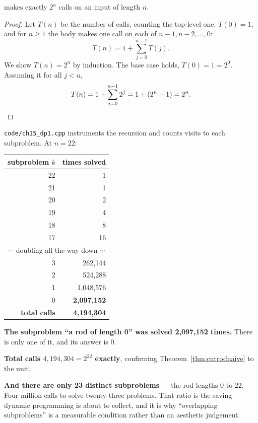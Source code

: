 \begin{theorem}\label{thm:cutrodnaive}
 makes exactly $2^{n}$ calls on an input of length $n$.
\end{theorem}

\begin{proof}
Let $T(n)$ be the number of calls, counting the top-level one. $T(0) = 1$, and
for $n \ge 1$ the body makes one call on each of $n-1, n-2, \ldots, 0$:
\[ T(n) = 1 + \sum_{j=0}^{n-1} T(j). \]
We show $T(n) = 2^{n}$ by induction. The base case holds, $T(0) = 1 = 2^{0}$.
Assuming it for all $j < n$,
\[ T(n) = 1 + \sum_{j=0}^{n-1} 2^{j} = 1 + (2^{n} - 1) = 2^{n}. \qedhere \]
\end{proof}

\begin{worked}
\texttt{code/ch15\_dp1.cpp} instruments the recursion and counts visits to each
subproblem. At $n = 22$:

\begin{center}
\begin{tabular}{@{}rr@{}}
\toprule
\rowcolor{primary!15}
subproblem $k$ & times solved \\
\midrule
22 & 1 \\
21 & 1 \\
20 & 2 \\
19 & 4 \\
18 & 8 \\
17 & 16 \\
\multicolumn{2}{c}{$\cdots$ doubling all the way down $\cdots$} \\
 3 & 262{,}144 \\
 2 & 524{,}288 \\
 1 & 1{,}048{,}576 \\
 0 & \textbf{2{,}097{,}152} \\
\midrule
\textbf{total calls} & \textbf{4{,}194{,}304} \\
\bottomrule
\end{tabular}
\end{center}

\smallskip
\textbf{The subproblem ``a rod of length 0'' was solved 2{,}097{,}152 times.}
There is only one of it, and its answer is 0.

\smallskip
\textbf{Total calls $4{,}194{,}304 = 2^{22}$ exactly}, confirming
Theorem~\ref{thm:cutrodnaive} to the unit.

\smallskip
\textbf{And there are only 23 distinct subproblems} --- the rod lengths $0$ to
$22$. Four million calls to solve twenty-three problems. That ratio is the
saving dynamic programming is about to collect, and it is why ``overlapping
subproblems'' is a measurable condition rather than an aesthetic judgement.
\end{worked}

